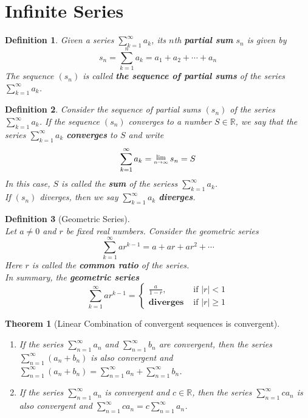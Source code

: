 \documentclass[12pt]{article}
\newcommand{\Lim}[1]{\raisebox{0.5ex}{\scalebox{0.8}{$\displaystyle \lim_{#1}\;$}}}
\newtheorem{definition}{Definition}[section]
\newtheorem{theorem}{Theorem}[section]
\theoremstyle{definition}
\begin{document}
\section{Infinite Series}
\begin{definition}\normalfont Given a series $\sum_{k=1}^\infty a_k$, its $n$th \textbf{partial sum} $s_n$ is given by
\[
s_n=\sum_{k=1}^n a_k = a_1+a_2+\cdots+a_n
\]
The sequence $(s_n)$ is called \textbf{the sequence of partial sums} of the series $\sum_{k=1}^\infty a_k$.
\end{definition}
\begin{definition}\normalfont Consider the sequence of partial sums $(s_n)$ of the series $\sum_{k=1}^\infty a_k$. If the sequence $(s_n)$ converges to a number $S\in\mathbb{R}$, we say that the series $\sum_{k=1}^\infty a_k$ \textbf{converges} to $S$ and write
\[
\sum_{k=1}^\infty a_k = \Lim{n\to\infty}s_n=S
\]
In this case, $S$ is called the \textbf{sum} of the seriess $\sum_{k=1}^\infty a_k$.\\
If $(s_n)$ diverges, then we say $\sum_{k=1}^\infty a_k$ \textbf{diverges}.
\end{definition}
\begin{definition}[Geometric Series]
\hfill\\\normalfont Let $a\neq 0$ and $r$ be fixed real numbers. Consider the geometric series
\[
\sum_{k=1}^\infty ar^{k-1} = a+ar+ar^2+\cdots
\]
Here $r$ is called the \textbf{common ratio} of the series.\\
In summary, the \textbf{geometric series}
\[
\sum_{k=1}^\infty ar^{k-1}=\begin{cases}
\frac{a}{1-r},&\text{ if }|r|<1\\
\textbf{diverges}&\text{ if }|r|\geq 1
\end{cases}
\]
\end{definition}
\begin{theorem}[Linear Combination of convergent sequences is convergent]
\hfill\\\normalfont
\begin{enumerate}
\item If the series $\sum_{n=1}^\infty a_n$ and $\sum_{n=1}^\infty b_n$ are convergent, then the series $\sum_{n=1}^\infty (a_n+b_n)$ is also convergent and  $\sum_{n=1}^\infty (a_n+b_n)=\sum_{n=1}^\infty a_n+\sum_{n=1}^\infty b_n$.
\item If the series $\sum_{n=1}^\infty a_n$ is convergent and $c\in\mathbb{R}$, then the series $\sum_{n=1}^\infty ca_n$ is also convergent and $\sum_{n=1}^\infty ca_n=c\sum_{n=1}^\infty a_n$.
\end{enumerate}
\end{theorem}
\end{document}
